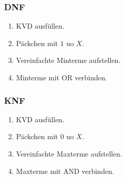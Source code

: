 \begin{center}
    \begin{minipage}{0.48\linewidth}
        \subsubsection{DNF}
        \begin{enumerate}
            \item KVD ausfüllen.
            \item Päckchen mit \emph{$1$} uo $X$.
            \item Vereinfachte Minterme aufstellen.
            \item Minterme mit OR verbinden.
        \end{enumerate}
    \end{minipage}
    \hfill\vline\hfill
    \begin{minipage}{0.48\linewidth}
        \subsubsection{KNF}
        \begin{enumerate}
            \item KVD ausfüllen.
            \item Päckchen mit \emph{$0$} uo $X$.
            \item Vereinfachte Maxterme aufstellen.
            \item Maxterme mit AND verbinden.
        \end{enumerate}
    \end{minipage}
\end{center}

